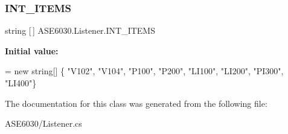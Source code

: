 \subsubsection{\texorpdfstring{I\+N\+T\+\_\+\+I\+T\+E\+MS}{INT\_ITEMS}}
{\footnotesize\ttfamily string \mbox{[}$\,$\mbox{]} A\+S\+E6030.\+Listener.\+I\+N\+T\+\_\+\+I\+T\+E\+MS\hspace{0.3cm}{\ttfamily [private]}}

{\bfseries Initial value\+:}
\begin{DoxyCode}
= \textcolor{keyword}{new} \textcolor{keywordtype}{string}[] \{
                                            \textcolor{stringliteral}{"V102"},
                                            \textcolor{stringliteral}{"V104"},
                                            \textcolor{stringliteral}{"P100"},
                                            \textcolor{stringliteral}{"P200"},
                                            \textcolor{stringliteral}{"LI100"},
                                            \textcolor{stringliteral}{"LI200"},
                                            \textcolor{stringliteral}{"PI300"},
                                            \textcolor{stringliteral}{"LI400"}\}
\end{DoxyCode}


The documentation for this class was generated from the following file\+:\begin{DoxyCompactItemize}
\item 
A\+S\+E6030/Listener.\+cs\end{DoxyCompactItemize}
